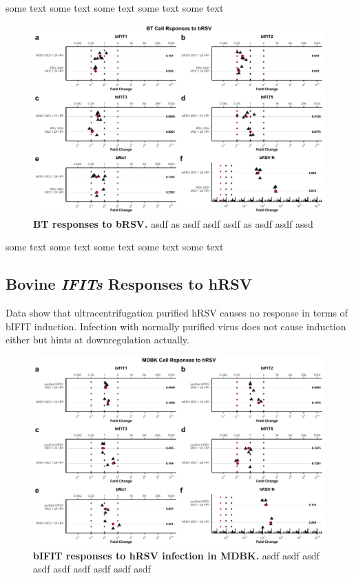 some text some text some text some text some text

\begin{figure}
    \centering
    \includegraphics[width=1\linewidth]{07. Chapter 2/Figs/02. Induction/09. bt_brsv.pdf}
    \caption[BT responses to bRSV.]{\textbf{BT responses to bRSV.} asdf as asdf asdf asdf as asdf asdf assd }
    \label{fig:BT responses to bRSV}
\end{figure}

some text some text some text some text some text





\subsection{Bovine \textit{IFITs} Responses to hRSV} \label{subsec:Bovine IFITs Responses to hRSV}

Data show that ultracentrifugation purified hRSV causes no response in terms of bIFIT induction. Infection with normally purified virus does not cause induction either but hints at downregulation actually.

\begin{figure}
    \centering
    \includegraphics[width=1\linewidth]{07. Chapter 2/Figs/02. Induction/07. mdbk_hrsv.pdf}
    \caption[bIFIT responses to hRSV infection in MDBK.]{\textbf{bIFIT responses to hRSV infection in MDBK.} asdf asdf asdf asdf asdf asdf asdf asdf asdf }
    \label{fig:bIFIT responses to hRSV infection in MDBK}
\end{figure}

